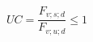 \documentclass[12pt]{article}
\begin{document}
\begin{displaymath}
UC = \frac {F_{v;s;d}} {F_{v;u;d}} \leq 1
\end{displaymath}
\end{document}
